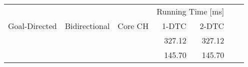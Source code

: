 \begin{tabular}{cccrrrr}
	\toprule
	              &               &         & \multicolumn{2}{c}{Running Time [\si{\milli\second}]}         \\
	Goal-Directed & Bidirectional & Core CH & 1-DTC                                                 & 2-DTC \\
	\midrule
	\xmark        & \cmark        & \cmark  & 327.12                                                     & 327.12     \\
	\cmark        & \cmark        & \cmark  & 145.70                                                     & 145.70     \\
	\bottomrule
\end{tabular}